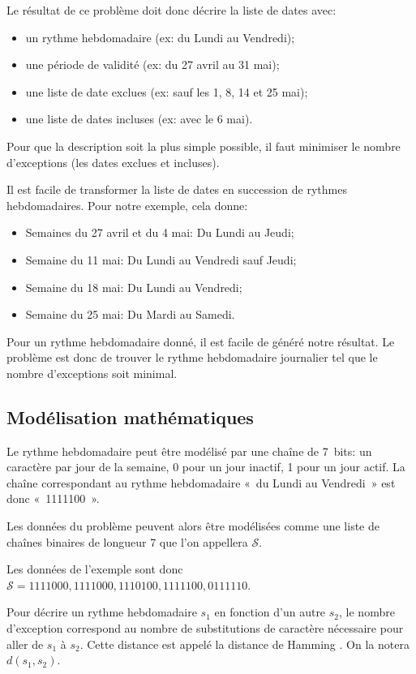 \documentclass{roadef}
\def\S{\mathcal{S}}
\begin{document}
Le résultat de ce problème doit donc décrire la liste de dates avec:
\begin{itemize}
\item un rythme hebdomadaire (ex: du Lundi au Vendredi);
\item une période de validité (ex: du 27 avril au 31 mai);
\item une liste de date exclues (ex: sauf les 1, 8, 14 et 25 mai);
\item une liste de dates incluses (ex: avec le 6 mai).
\end{itemize}

Pour que la description soit la plus simple possible, il faut
minimiser le nombre d'exceptions (les dates exclues et incluses).

Il est facile de transformer la liste de dates en succession de
rythmes hebdomadaires. Pour notre exemple, cela donne:
\begin{itemize}
\item Semaines du 27 avril et du 4 mai: Du Lundi au Jeudi;
\item Semaine du 11 mai: Du Lundi au Vendredi sauf Jeudi;
\item Semaine du 18 mai: Du Lundi au Vendredi;
\item Semaine du 25 mai: Du Mardi au Samedi.
\end{itemize}

Pour un rythme hebdomadaire donné, il est facile de généré notre
résultat.  Le problème est donc de trouver le rythme hebdomadaire
journalier tel que le nombre d'exceptions soit minimal.

\subsection{Modélisation mathématiques}

Le rythme hebdomadaire peut être modélisé par une chaîne de 7~bits: un
caractère par jour de la semaine, 0 pour un jour inactif, 1 pour un
jour actif. La chaîne correspondant au rythme hebdomadaire «~du Lundi
au Vendredi~» est donc «~1111100~».

Les données du problème peuvent alors être modélisées comme une liste
de chaînes binaires de longueur 7 que l'on appellera $\S$.

Les données de l'exemple sont donc
\begin{math}
  \S = 1111000, 1111000, 1110100, 1111100, 0111110
\end{math}.

Pour décrire un rythme hebdomadaire $s_1$ en fonction d'un autre
$s_2$, le nombre d'exception correspond au nombre de substitutions de
caractère nécessaire pour aller de $s_1$ à $s_2$. Cette distance est
appelé la distance de Hamming \cite{hamming1950error}. On la notera
$d(s_1, s_2)$.
\end{document}
